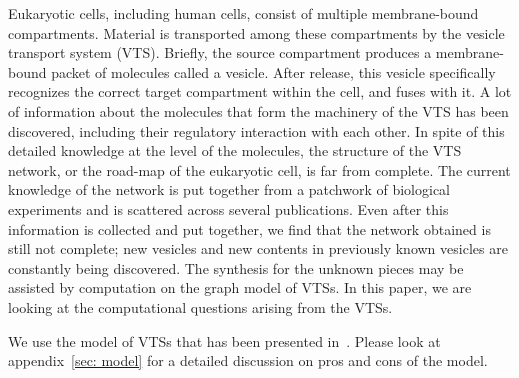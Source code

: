 
Eukaryotic cells, including human cells, consist of multiple membrane-bound compartments.
%
Material is transported among these compartments by the vesicle
transport system (VTS).
%
Briefly, the source compartment produces a membrane-bound packet of
molecules called a vesicle.
%
After release, this vesicle specifically recognizes the correct target
compartment within the cell, and fuses with it.
%
A lot of information about the molecules that form the machinery of
the VTS has been discovered, including their regulatory interaction
with each other. 
%
In spite of this detailed knowledge at the level of the molecules, the
structure of the VTS network, or the road-map of the eukaryotic cell,
is far from complete.
%
The current knowledge of the network is put together from a patchwork
of biological experiments and is scattered across several publications.
%
Even after this information is collected and put together, we find
that the network obtained is still not complete; new vesicles and new
contents in previously known vesicles are constantly being discovered.
%
The synthesis for the unknown pieces may be assisted by computation on
the graph model of VTSs.
%
% 
%
%
%
%
%
In this paper, we are looking at the computational questions 
arising from the VTSs.


We use the model of VTSs that has been presented in~\cite{shukla2017discovering}.
%
Please look at appendix~\ref{sec: model}
for a detailed discussion on pros and cons of the model.


